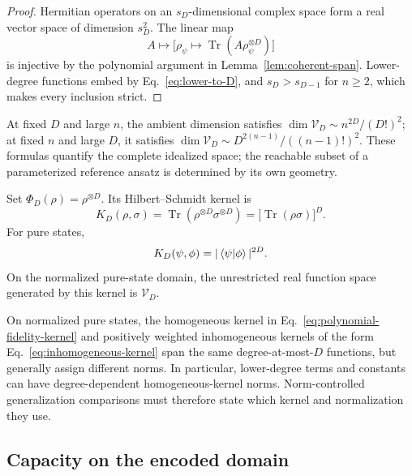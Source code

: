 \documentclass[pdflatex,sn-mathphys,NameDate,iicol]{sn-jnl}
\newcommand{\Tr}{\operatorname{Tr}}
\newcommand{\cV}{\mathcal{V}}
\begin{document}
\begin{proof}
Hermitian operators on an $s_D$-dimensional complex space form a real
vector space of dimension $s_D^2$. The linear map
\begin{equation}
  A\longmapsto
  \bigl[\rho_\psi\longmapsto
  \Tr(A\rho_\psi^{\otimes D})\bigr]
\end{equation}
is injective by the polynomial argument in
Lemma~\ref{lem:coherent-span}. Lower-degree functions embed by
Eq.~\eqref{eq:lower-to-D}, and
$s_D>s_{D-1}$ for $n\ge2$, which makes every inclusion strict.
\end{proof}

At fixed $D$ and large $n$, the ambient dimension satisfies
$\dim\cV_D\sim n^{2D}/(D!)^2$; at fixed $n$ and large $D$, it satisfies
$\dim\cV_D\sim D^{2(n-1)}/((n-1)!)^2$. These formulas quantify the complete
idealized space; the reachable subset of a parameterized reference ansatz is
determined by its own geometry.

\begin{corollary}
\label{cor:homogeneous-kernel}
Set $\Phi_D(\rho)=\rho^{\otimes D}$. Its Hilbert--Schmidt kernel is
\begin{equation}
  K_D(\rho,\sigma)
  =
  \Tr\!\left(\rho^{\otimes D}\sigma^{\otimes D}\right)
  =
  \bigl[\Tr(\rho\sigma)\bigr]^D.
  \label{eq:polynomial-fidelity-kernel}
\end{equation}
For pure states,
\begin{equation}
  K_D(\psi,\phi)=|\braket{\psi | \phi}|^{2D}.
\end{equation}
On the normalized pure-state domain, the unrestricted real function space
generated by this kernel is $\cV_D$.
\end{corollary}

\begin{remark}
On normalized pure states, the homogeneous kernel in
Eq.~\eqref{eq:polynomial-fidelity-kernel} and positively weighted
inhomogeneous kernels of the form
Eq.~\eqref{eq:inhomogeneous-kernel} span the same degree-at-most-$D$
functions, but generally assign different norms. In particular, lower-degree
terms and constants can have degree-dependent homogeneous-kernel norms.
Norm-controlled generalization comparisons must therefore state which
kernel and normalization they use.
\end{remark}

\subsection{Capacity on the encoded domain}
\end{document}
